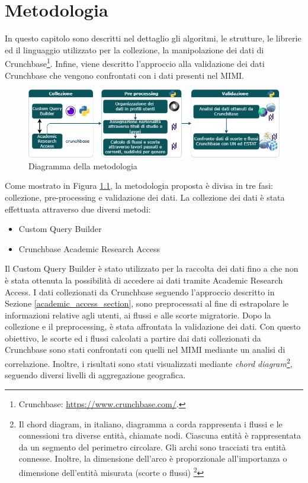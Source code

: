 \chapter{Metodologia}
\label{capitolometodologia}
In questo capitolo sono descritti nel dettaglio gli algoritmi, le strutture, le librerie ed il linguaggio utilizzato per la collezione, la manipolazione dei dati di Crunchbase\footnote{Crunchbase: \url{https://www.crunchbase.com/}.}. Infine, viene descritto l'approccio alla validazione dei dati Crunchbase che vengono confrontati con i dati presenti nel MIMI.\par
{}
\begin{figure}[t]
    \centering
    \includegraphics[width=1\textwidth]{images/SVG/diagram2.png}
    \caption{Diagramma della metodologia}
    \label{fig:digram}
\end{figure}

Come mostrato in Figura \ref{fig:digram}, la metodologia proposta è divisa in tre fasi: collezione, pre-processing e validazione dei dati. 
La collezione dei dati è stata effettuata attraverso due diversi metodi: 
\begin{itemize}
    \item Custom Query Builder
    \item Crunchbase Academic Research Access
\end{itemize}
Il Custom Query Builder è stato utilizzato per la raccolta dei dati fino a che non è stata ottenuta la possibilità di accedere ai dati tramite Academic Research Access. 
I dati collezionati da Crunchbase seguendo l'approccio descritto in Sezione \ref{academic_access_section}, sono preprocessati al fine di estrapolare le informazioni relative agli utenti, ai flussi e alle scorte migratorie. 
Dopo la collezione e il preprocessing, è stata affrontata la validazione dei dati. Con questo obiettivo, le scorte ed i flussi calcolati a partire dai dati collezionati da Crunchbase sono stati confrontati con quelli nel MIMI mediante un analisi di correlazione.
Inoltre, i risultati sono stati visualizzati mediante 
\textit{chord diagram}\footnote{Il chord diagram, in italiano, diagramma a corda rappresenta i flussi e le connessioni tra diverse entità, chiamate nodi. Ciascuna entità è rappresentata da un segmento del perimetro circolare. Gli archi sono tracciati tra entità connesse. Inoltre, la dimensione dell'arco è proporzionale all'importanza o dimensione dell'entità misurata (scorte o flussi) \footnote{(From Data to Viz: Chord Diagram \url{https://www.data-to-viz.com/graph/chord.html}.}}, seguendo diversi livelli di aggregazione geografica.

